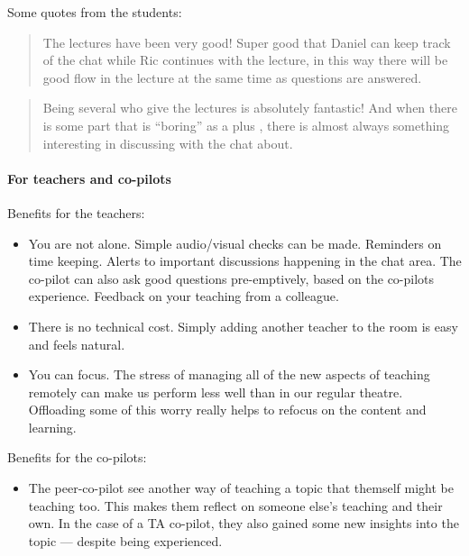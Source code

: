 \documentclass{article}
\begin{document}
Some quotes from the students:
\begin{quote}
The lectures have been very good! Super good that Daniel can keep track of
the chat while Ric continues with the lecture, in this way there will be
good flow in the lecture at the same time as questions are answered.
\end{quote}

\begin{quote}
Being several who give the lectures is absolutely fantastic! And when there
is some part that is \enquote{boring} as a plus , there is almost always something
interesting in discussing with the chat about.
\end{quote}


\paragraph{For teachers and co-pilots}

Benefits for the teachers:

\begin{itemize}
  \item You are not alone. Simple audio/visual checks can be made. Reminders on 
    time keeping. Alerts to important discussions happening in the chat area.
    The co-pilot can also ask good questions pre-emptively, based on the co-pilots experience.
    Feedback on your teaching from a colleague.

  \item There is no technical cost. Simply adding another teacher to the room 
    is easy and feels natural.

  \item You can focus. The stress of managing all of the new aspects of 
    teaching remotely can make us perform less well than in our regular 
    theatre. Offloading some of this worry really helps to refocus on the 
    content and learning.
\end{itemize}

Benefits for the co-pilots:

\begin{itemize}
  \item The peer-co-pilot see another way of teaching a topic that themself 
    might be teaching too.
    This makes them reflect on someone else's teaching and their own.
    In the case of a TA co-pilot, they also gained some new insights into the
    topic --- despite being experienced.
\end{itemize}
\end{document}

